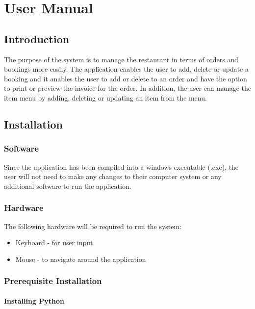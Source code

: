 \chapter{User Manual}

\section{Introduction}
The purpose of the system is to manage the restaurant in terms of orders and bookings more easily. The application enables the user to add, delete or update a booking and it anables the user to add or delete to an order and have the option to print or preview the invoice for the order. In addition, the user can manage the item menu by adding, deleting or updating an item from the menu.

\section{Installation}

\subsection{Software}
Since the application has been compiled into a windows executable (.exe), the user will not need to make any changes to their computer system or any additional software to run the application.

\subsection{Hardware}

The following hardware will be required to run the system:

\begin{itemize}

	\item Keyboard - for user input
	\item Mouse - to navigate around the application
	

\end{itemize}



\subsection{Prerequisite Installation}

\subsubsection{Installing Python}

